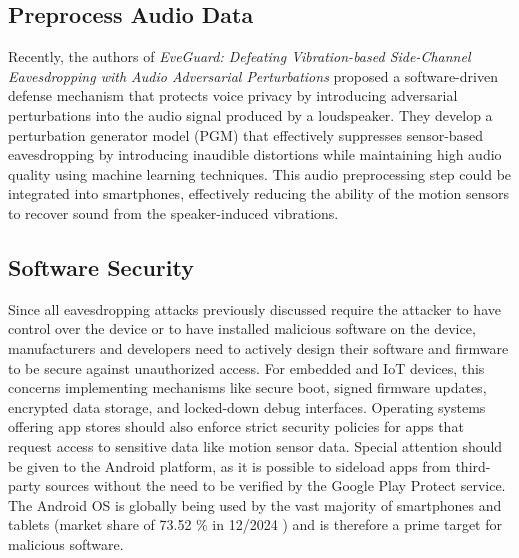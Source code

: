\documentclass[sigconf, nonacm]{acmart}
\begin{document}
\subsection{Preprocess Audio Data}
Recently, the authors of \textit{EveGuard: Defeating Vibration-based Side-Channel Eavesdropping with Audio Adversarial Perturbations} \cite{EveGuard2024} proposed a software-driven defense mechanism that protects voice privacy by introducing adversarial perturbations into the audio signal produced by a loudspeaker.
They develop a perturbation generator model (PGM) that effectively suppresses sensor-based eavesdropping by introducing inaudible distortions while maintaining high audio quality using machine learning techniques.
This audio preprocessing step could be integrated into smartphones, effectively reducing the ability of the motion sensors to recover sound from the speaker-induced vibrations.

\subsection{Software Security}
Since all eavesdropping attacks previously discussed require the attacker to have control over the device or to have installed malicious software on the device, manufacturers and developers need to actively design their software and firmware to be secure against unauthorized access.
For embedded and IoT devices, this concerns implementing mechanisms like secure boot, signed firmware updates, encrypted data storage, and locked-down debug interfaces.
Operating systems offering app stores should also enforce strict security policies for apps that request access to sensitive data like motion sensor data.
Special attention should be given to the Android platform, as it is possible to sideload apps from third-party sources without the need to be verified by the Google Play Protect service. The Android OS is globally being used by the vast majority of smartphones and tablets (market share of 73.52 \% in 12/2024 \cite{StatcounterOSMarketShare}) and is therefore a prime target for malicious software.
\end{document}
